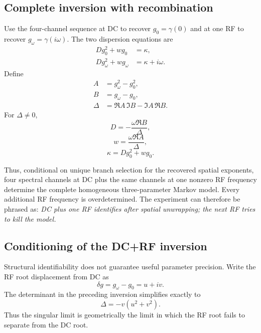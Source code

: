 \documentclass[11pt]{article}
\begin{document}
\subsection{Complete inversion with recombination}

Use the four-channel sequence at DC to recover $g_0=\gamma(0)$ and at one RF to recover $g_\omega=\gamma(i\omega)$. The two dispersion equations are
\begin{align}
Dg_0^2+wg_0&=\kappa,\\
Dg_\omega^2+wg_\omega&=\kappa+i\omega.
\end{align}
Define
\begin{align}
A&=g_\omega^2-g_0^2,\\
B&=g_\omega-g_0,\\
\Delta&=\Re A\,\Im B-\Im A\,\Re B.
\end{align}
For $\Delta\neq0$,
\begin{equation}
\boxed{D=-\frac{\omega\Re B}{\Delta},}
\label{eq:Drecomb}
\end{equation}
\begin{equation}
\boxed{w=\frac{\omega\Re A}{\Delta},}
\label{eq:wrecomb}
\end{equation}
\begin{equation}
\boxed{\kappa=Dg_0^2+wg_0.}
\label{eq:krecomb}
\end{equation}

Thus, conditional on unique branch selection for the recovered spatial exponents, four spectral channels at DC plus the same channels at one nonzero RF frequency determine the complete homogeneous three-parameter Markov model. Every additional RF frequency is overdetermined. The experiment can therefore be phrased as: \emph{DC plus one RF identifies after spatial unwrapping; the next RF tries to kill the model.}

\subsection{Conditioning of the DC+RF inversion}

Structural identifiability does not guarantee useful parameter precision. Write the RF root displacement from DC as
\begin{equation}
\delta g=g_\omega-g_0=u+iv.
\end{equation}
The determinant in the preceding inversion simplifies exactly to
\begin{equation}
\boxed{\Delta=-v(u^2+v^2).}
\label{eq:delta_geometry}
\end{equation}
Thus the singular limit is geometrically the limit in which the RF root fails to separate from the DC root.
\end{document}
